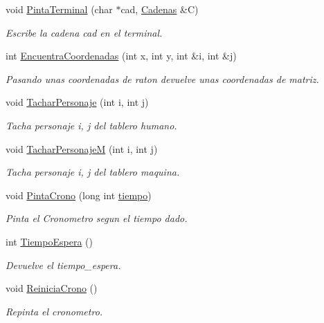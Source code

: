 \begin{CompactItemize}
void \hyperlink{class_config_fc16e01f77244e2ea4786c814cb4fa99}{PintaTerminal} (char $\ast$cad, \hyperlink{class_cadenas}{Cadenas} \&C)
\begin{CompactList}\small\item\em Escribe la cadena cad en el terminal. \item\end{CompactList}\item 
int \hyperlink{class_config_d2717716bb3e5cbca52b4fb906cfc2b0}{EncuentraCoordenadas} (int x, int y, int \&i, int \&j)
\begin{CompactList}\small\item\em Pasando unas coordenadas de raton devuelve unas coordenadas de matriz. \item\end{CompactList}\item 
void \hyperlink{class_config_dc8163da35c14b46f65c79bdcfea4d6e}{TacharPersonaje} (int i, int j)
\begin{CompactList}\small\item\em Tacha personaje i, j del tablero humano. \item\end{CompactList}\item 
void \hyperlink{class_config_b0ece1c4e60dc3fc432b70b710ec7c33}{TacharPersonajeM} (int i, int j)
\begin{CompactList}\small\item\em Tacha personaje i, j del tablero maquina. \item\end{CompactList}\item 
void \hyperlink{class_config_584298fc8c9442a2be186d3a39776859}{PintaCrono} (long int \hyperlink{class_config_ab38937ac969b6c7a1bb516829a4b3d7}{tiempo})
\begin{CompactList}\small\item\em Pinta el Cronometro segun el tiempo dado. \item\end{CompactList}\item 
int \hyperlink{class_config_d6ab8b5ecdb0602a9d3b6b70ed09f766}{TiempoEspera} ()
\begin{CompactList}\small\item\em Devuelve el tiempo\_\-espera. \item\end{CompactList}\item 
void \hyperlink{class_config_5502bfd9175981e9a5c8543e618a2ace}{ReiniciaCrono} ()
\begin{CompactList}\small\item\em Repinta el cronometro. \item\end{CompactList}\item 

\end{CompactItemize}
